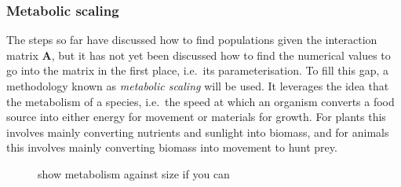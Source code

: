 

\subsubsection{Metabolic scaling}
The steps so far have discussed how to find populations given the interaction matrix $\mathbf{A}$, but it has not yet been discussed how to find the numerical values to go into the matrix in the first place, i.e.\ its parameterisation.
To fill this gap, a methodology known as \emph{metabolic scaling} will be used. It leverages the idea that the metabolism of a species, i.e.\ the speed at which an organism converts a food source into either energy for movement or materials for growth. For plants this involves mainly converting nutrients and sunlight into biomass, and for animals this involves mainly converting biomass into movement to hunt prey.

\begin{figure}
    \caption[metabolism]{show metabolism against size if you can}
    \label{fig:my_label}
\end{figure}

